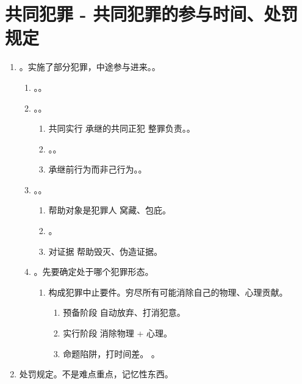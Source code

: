 \section{共同犯罪 - 共同犯罪的参与时间、处罚规定}
\begin{enumerate}
  \item {}。实施了部分犯罪，中途参与进来。。
        \begin{enumerate}
          \item {}。。
          \item {}。。
                \begin{enumerate}
                  \item 共同实行 \yjt 承继的共同正犯 \yjt 整罪负责。。
                  \item {}。。
                  \item 承继前行为而非己行为。。
                \end{enumerate}
          \item {}。。
                \begin{enumerate}
                  \item 帮助对象是犯罪人 \yjt 窝藏、包庇。
                  \item {}。
                  \item 对证据 \yjt 帮助毁灭、伪造证据。
                \end{enumerate}
          \item {}。先要确定处于哪个犯罪形态。
                \begin{enumerate}
                  \item 构成犯罪中止要件。穷尽所有可能消除自己的物理、心理贡献。
                        \begin{enumerate}
                          \item 预备阶段 \yjt 自动放弃、打消犯意。
                          \item 实行阶段 \yjt 消除物理 + 心理。
                          \item 命题陷阱，打时间差。
                                。
                        \end{enumerate}
                \end{enumerate}
        \end{enumerate}
  \item 处罚规定。不是难点重点，记忆性东西。
\end{enumerate}
